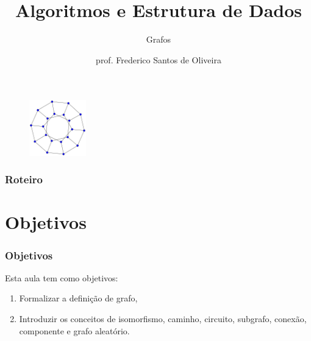 \documentclass[aspectratio=169]{beamer}
\title[Grafos]{Algoritmos e Estrutura de Dados}
\subtitle{Grafos}
\author[Frederico Santos de Oliveira]{prof. Frederico Santos de Oliveira}
\institute[UFMT]{Universidade Federal de Mato Grosso\\ Faculdade de Engenharia}
\date{}
\begin{document}
\begin{frame}
\titlepage %

\begin{figure}[!h]
  \centering
  \includegraphics[width=70pt]{imagens/introducao.png}
  \label{fig_introducao}
\end{figure}
\end{frame}


\begin{frame}
\frametitle{Roteiro} %
\tableofcontents %
\end{frame}


\section{Objetivos}

\begin{frame}
\frametitle{Objetivos}

Esta aula tem como objetivos:

\begin{enumerate}
\item Formalizar a definição de grafo,
\item Introduzir os conceitos de isomorfismo, caminho, circuito, subgrafo, conexão, componente e grafo aleatório. 
\end{enumerate}
\end{frame}
\end{document}
